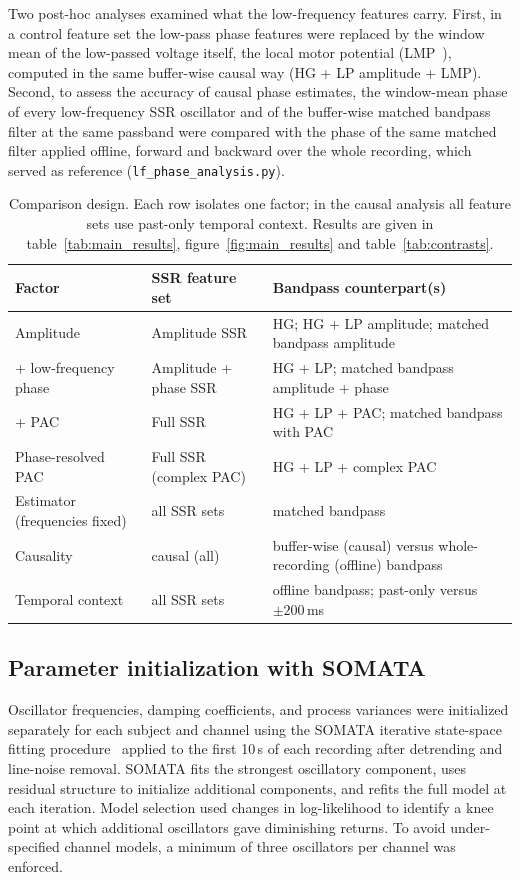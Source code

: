 \documentclass{iopjournal}
\begin{document}
Two post-hoc analyses examined what the low-frequency features carry. First, in a control feature set the low-pass phase features were replaced by the window mean of the low-passed voltage itself, the local motor potential (LMP~\cite{Schalk2007}), computed in the same buffer-wise causal way (HG + LP amplitude + LMP). Second, to assess the accuracy of causal phase estimates, the window-mean phase of every low-frequency SSR oscillator and of the buffer-wise matched bandpass filter at the same passband were compared with the phase of the same matched filter applied offline, forward and backward over the whole recording, which served as reference (\texttt{lf\_phase\_analysis.py}).

\begin{table}[!htb]
\centering
\small
\caption{Comparison design. Each row isolates one factor; in the causal analysis all feature sets use past-only temporal context. Results are given in table~\ref{tab:main_results}, figure~\ref{fig:main_results} and table~\ref{tab:contrasts}.}
\label{tab:ladder}
\begin{tabular}{p{}p{}p{}}
\toprule
\textbf{Factor} & \textbf{SSR feature set} & \textbf{Bandpass counterpart(s)} \\
\midrule
Amplitude & Amplitude SSR & HG; HG + LP amplitude; matched bandpass amplitude \\
+ low-frequency phase & Amplitude + phase SSR & HG + LP; matched bandpass amplitude + phase \\
+ PAC & Full SSR & HG + LP + PAC; matched bandpass with PAC \\
Phase-resolved PAC & Full SSR (complex PAC) & HG + LP + complex PAC \\
Estimator (frequencies fixed) & all SSR sets & matched bandpass \\
Causality & causal (all) & buffer-wise (causal) versus whole-recording (offline) bandpass \\
Temporal context & all SSR sets & offline bandpass; past-only versus $\pm200$\,ms \\
\bottomrule
\end{tabular}
\end{table}

\subsection{Parameter initialization with SOMATA}
\label{sec:parameters}

Oscillator frequencies, damping coefficients, and process variances were initialized separately for each subject and channel using the SOMATA iterative state-space fitting procedure~\cite{Beck2022SOMATA} applied to the first 10\,s of each recording after detrending and line-noise removal. SOMATA fits the strongest oscillatory component, uses residual structure to initialize additional components, and refits the full model at each iteration. Model selection used changes in log-likelihood to identify a knee point at which additional oscillators gave diminishing returns. To avoid under-specified channel models, a minimum of three oscillators per channel was enforced.
\end{document}
